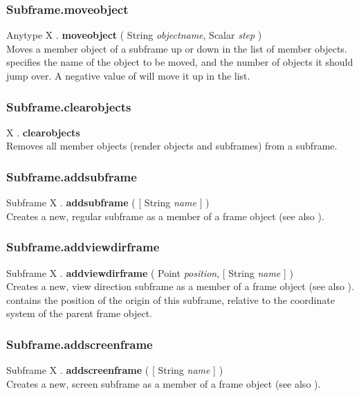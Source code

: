 \subsubsection{Subframe.moveobject \label{F:Subframe:moveobject}}
Anytype X . \textbf{moveobject} ( String \textit{objectname}, Scalar \textit{step} ) \\
Moves a member object of a subframe up or down in the list of member objects.  specifies the name of the object to be moved, and  the number of objects it should jump over. A negative value of  will move it up in the list.

\subsubsection{Subframe.clearobjects \label{F:Subframe:clearobjects}}
X . \textbf{clearobjects} \\
Removes all member objects (render objects and subframes) from a subframe.

\subsubsection{Subframe.addsubframe \label{F:Subframe:addsubframe}}
Subframe X . \textbf{addsubframe} (  [ String \textit{name} ] ) \\
Creates a new, regular subframe as a member of a frame object (see also ).

\subsubsection{Subframe.addviewdirframe \label{F:Subframe:addviewdirframe}}
Subframe X . \textbf{addviewdirframe} ( Point \textit{position},  [ String \textit{name} ] ) \\
Creates a new, view direction subframe as a member of a frame object (see also ).  contains the position of the origin of this subframe, relative to the coordinate system of the parent frame object.


\subsubsection{Subframe.addscreenframe \label{F:Subframe:addscreenframe}}
Subframe X . \textbf{addscreenframe} (  [ String \textit{name} ] ) \\
Creates a new, screen subframe as a member of a frame object (see also ).


